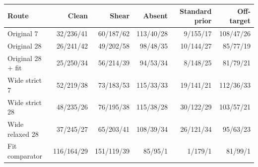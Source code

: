 \begin{tabular}{lrrrrr}
\toprule
Route & Clean & Shear & Absent & Standard prior & Off-target \\
\midrule
Original 7 & 32/236/41 & 60/187/62 & 113/40/28 & 9/155/17 & 108/47/26 \\
Original 28 & 26/241/42 & 49/202/58 & 98/48/35 & 10/144/27 & 85/77/19 \\
Original 28 + fit & 25/250/34 & 56/214/39 & 94/53/34 & 8/148/25 & 81/79/21 \\
Wide strict 7 & 52/219/38 & 73/183/53 & 115/33/33 & 19/141/21 & 112/36/33 \\
Wide strict 28 & 48/235/26 & 76/195/38 & 115/38/28 & 30/122/29 & 103/57/21 \\
Wide relaxed 28 & 37/245/27 & 65/203/41 & 108/39/34 & 26/121/34 & 95/63/23 \\
Fit comparator & 116/164/29 & 151/119/39 & 85/95/1 & 1/179/1 & 81/99/1 \\
\bottomrule
\end{tabular}
